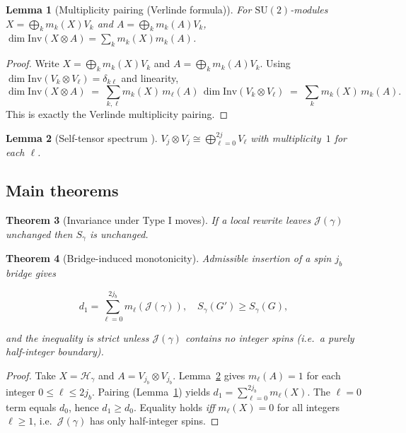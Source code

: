 \documentclass[11pt]{article}
\newtheorem{theorem}{Theorem}[section] \newtheorem{lemma}[theorem]{Lemma} \newtheorem{definition}[theorem]{Definition} \newtheorem{corollary}[theorem]{Corollary} \newtheorem{remark}[theorem]{Remark} \newtheorem{example}[theorem]{Example}
\newcommand{\SU}{\mathrm{SU}(2)}
\newcommand{\Hil}{\mathcal{H}}
\newcommand{\Inv}{\mathrm{Inv}}
\newcommand{\Cut}{\gamma}
\newcommand{\JS}{\mathcal{J}} %
\begin{document}
\begin{lemma}[Multiplicity pairing \textnormal{(Verlinde formula)}]\label{lem:pairing} For $\SU$-modules $X=\bigoplus_k m_k(X)V_k$ and $A=\bigoplus_k m_k(A)V_k$, $\dim\Inv(X\otimes A)=\sum_k m_k(X)m_k(A)$. \end{lemma}

\begin{proof}
Write $X=\bigoplus_k m_k(X)V_k$ and
$A=\bigoplus_k m_k(A)V_k$.  Using
$\dim\Inv(V_k\otimes V_\ell)=\delta_{k\ell}$ and linearity,
\[
  \dim\Inv(X\otimes A)
  \;=\;
  \sum_{k,\ell} m_k(X)\,m_\ell(A)\,
        \dim\Inv(V_k\otimes V_\ell)
  \;=\;
  \sum_k m_k(X)\,m_k(A).
\]
This is exactly the Verlinde multiplicity pairing.
\end{proof}

\begin{lemma}[Self-tensor spectrum \cite{FultonHarris1991}]\label{lem:selftensor} $V_j\otimes V_j\cong\bigoplus_{\ell=0}^{2j}V_{\ell}$ with multiplicity~$1$ for each $\ell$. \end{lemma}

\subsection{Main theorems}

\begin{theorem}[Invariance under Type I moves]\label{thm:invariance} If a local rewrite leaves $\JS(\Cut)$ unchanged then $S_{\Cut}$ is unchanged. \end{theorem}

\begin{theorem}[Bridge-induced monotonicity]\label{thm:bridge} Admissible insertion of a spin $j_b$ bridge gives

$$
d_1=\sum_{\ell=0}^{2j_b} m_{\ell}(\JS(\Cut)),\quad S_{\Cut}(G')\ge S_{\Cut}(G),
$$

and the inequality is \emph{strict} unless $\JS(\Cut)$ contains no integer spins (i.e.\ a purely half-integer boundary).

\end{theorem} 

\begin{proof} Take $X=\Hil_{\Cut}$ and $A=V_{j_b}\otimes V_{j_b}$. Lemma~\ref{lem:selftensor} gives $m_{\ell}(A)=1$ for each integer $0\le\ell\le2j_b$. Pairing (Lemma~\ref{lem:pairing}) yields $d_1=\sum_{\ell=0}^{2j_b} m_{\ell}(X)$. The $\ell=0$ term equals $d_0$, hence $d_1\ge d_0$. Equality holds \emph{iff} $m_{\ell}(X)=0$ for all integers $\ell\ge1$, i.e.\ $\JS(\Cut)$ has only half-integer spins. \end{proof}
\end{document}
